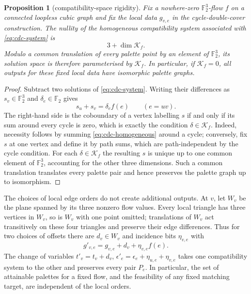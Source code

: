 \documentclass[11pt,a4paper]{article}
\newtheorem{proposition}[theorem]{Proposition}
\theoremstyle{definition}
\theoremstyle{remark}
\begin{document}
\begin{proposition}[compatibility-space rigidity]\label{prop:cdc-rigidity}
Fix a nowhere-zero $\mathbb F_2^3$-flow $f$ on a connected loopless cubic graph and fix the local data $g_{v,e}$ in the cycle-double-cover construction.  The nullity of the homogeneous compatibility system associated with \eqref{eq:cdc-system} is
\[
 3+\dim\mathcal K_f.
\]
Modulo a common translation of every palette point by an element of $\mathbb F_2^3$, its solution space is therefore parameterised by $\mathcal K_f$.  In particular, if $\mathcal K_f=0$, all outputs for these fixed local data have isomorphic palette graphs.
\end{proposition}
\begin{proof}
Subtract two solutions of \eqref{eq:cdc-system}.  Writing their differences as $s_v\in\mathbb F_2^3$ and $\delta_e\in\mathbb F_2$ gives
\begin{equation}\label{eq:cdc-homogeneous}
 s_u+s_v=\delta_e f(e)\qquad(e=uv).
\end{equation}
The right-hand side is the coboundary of a vertex labelling $s$ if and only if its sum around every cycle is zero, which is exactly the condition $\delta\in\mathcal K_f$.  Indeed, necessity follows by summing \eqref{eq:cdc-homogeneous} around a cycle; conversely, fix $s$ at one vertex and define it by path sums, which are path-independent by the cycle condition.  For each $\delta\in\mathcal K_f$ the resulting $s$ is unique up to one common element of $\mathbb F_2^3$, accounting for the other three dimensions.  Such a common translation translates every palette pair and hence preserves the palette graph up to isomorphism.
\end{proof}

The choices of local edge orders do not create additional outputs.  At $v$, let $W_v$ be the plane spanned by its three nonzero flow values.  Every local triangle has three vertices in $W_v$, so is $W_v$ with one point omitted; translations of $W_v$ act transitively on these four triangles and preserve their edge differences.  Thus for two choices of offsets there are $d_v\in W_v$ and incidence bits $\eta_{v,e}$ with
\[
 g'_{v,e}=g_{v,e}+d_v+\eta_{v,e}f(e).
\]
The change of variables $t'_v=t_v+d_v$, $\epsilon'_e=\epsilon_e+\eta_{u,e}+\eta_{v,e}$ takes one compatibility system to the other and preserves every pair $P_e$.  In particular, the set of attainable palettes for a fixed flow, and the feasibility of any fixed matching target, are independent of the local orders.
\end{document}
